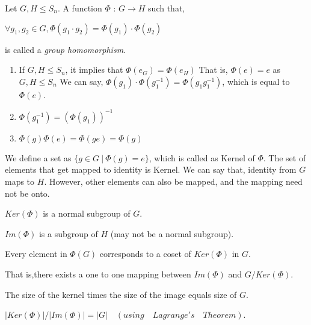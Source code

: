  \begin{definition}Let  $G,H \leqslant S_n$. A function $\Phi$ : $G \rightarrow H$  such that,
\begin{center}
 $\forall g_1,g_2\in G, \Phi(g_1\cdot g_2) = \Phi(g_1)\cdot\Phi(g_2) $
\end{center} 
is called a {\em group homomorphism}.
 \end{definition}
  \begin{observation}
 \begin{enumerate}
 \item If $G,H \leqslant S_n$, it implies that $\Phi(e_G)= \Phi(e_H)$
 That is, $\Phi(e)= e$ as $G,H \leqslant S_n$
 We can say, $\Phi(g_1)\cdot\Phi(g_1^{-1}) = \Phi(g_1g_1^{-1})$, which is equal to $\Phi(e)$.
 
 \item $\Phi(g_1^{-1}) = (\Phi(g_1))^{-1}$
 \item $\Phi(g)\Phi(e) = \Phi(ge) = \Phi(g)$

  \end{enumerate}
  \end{observation}
We define a set as $\{g\in G ~|~ \Phi(g)=e\}$, which is called as Kernel of $\Phi$. The set of elements that get mapped to identity is Kernel. We can say that, identity from $G$ maps to $H$. However, other elements can also be mapped, and the mapping need not be onto.

\begin{claim}
$Ker(\Phi)$ is a normal subgroup of $G$.
\end{claim}
\begin{claim}
$Im(\Phi)$ is a subgroup of $H$ (may not be a normal subgroup).
\end{claim}

\begin{claim}
Every element in $\Phi(G)$ corresponds to a coset of $Ker(\Phi)$ in $G$.


That is,there exists a one to one mapping between $Im(\Phi)$ and $G/Ker(\Phi).$
\end{claim}

\begin{claim}
The size of the kernel times the size of the image equals size of $G$.

$|Ker(\Phi)|/|Im(\Phi)|= |G|\quad (using\quad Lagrange's\quad Theorem)$.
\end{claim}

 
 
 
 
 
 
 
 
 
 
 
 



 










 





















